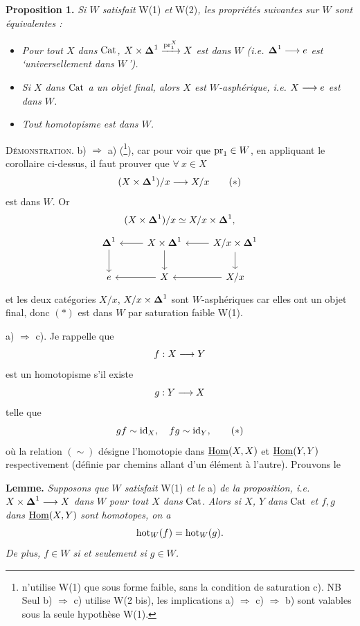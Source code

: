 \textbf{Proposition 1.} \textit{Si $W$ satisfait} W(1) \textit{et} W(2)\textit{, les propriétés suivantes sur $W$ sont équivalentes :}

\begin{itemize}[leftmargin=*]
\item[\textit{a)}] \textit{Pour tout $X$ dans $\mathrm{Cat}$, $X \times \boldsymbol{\Delta}^1 \xrightarrow{\mathrm{pr}_1^X} X$ est dans $W$ (i.e. $\boldsymbol{\Delta}^1 \longrightarrow e$ est `universellement dans $W$\,').}

\item[\textit{b)}] \textit{Si $X$ dans $\mathrm{Cat}$ a un objet final, alors $X$ est $W$-asphérique, i.e. $X \longrightarrow e$ est dans $W$.}

\item[\textit{c)}] \textit{Tout homotopisme est dans $W$.}
\end{itemize}

\clearpage


\textsc{Démonstration.} b) $\Longrightarrow$ a) (\footnote{n'utilise W(1) que sous forme faible, sans la condition de saturation c). NB Seul b) $\Longrightarrow$ c) utilise W(2 bis), les implications a) $\Longrightarrow$ c) $\Longrightarrow$ b) sont valables sous la seule hypothèse W(1).}), car pour voir que $\mathrm{pr}_1 \in W$, en appliquant le corollaire ci-dessus, il faut prouver que $\forall\ x \in X$
\[ (X \times \boldsymbol{\Delta}^1)/x \longrightarrow X/x \tag*{$(*)$} \]
est dans $W$. Or
\[ (X \times \boldsymbol{\Delta}^1)/x \simeq X/x \times \boldsymbol{\Delta}^1, \]
\[
\begin{tikzcd}
\Dl^1 \arrow[d] & X \times \Dl^1 \arrow[l] \arrow[d] & X/x \times \Dl^1 \arrow[l] \arrow[d] \\
e & X \arrow[l] & X/x \arrow[l]
\end{tikzcd}
\]
 et les deux catégories $X/x$, $X/x \times \boldsymbol{\Delta}^1$ sont $W$-asphériques car elles ont un objet final, donc $(*)$ est dans $W$ par saturation faible W(1).

a) $\Longrightarrow$ c). Je rappelle que
\[ f : X \longrightarrow Y \]
est un homotopisme s'il existe
\[ g : Y \longrightarrow X \]
telle que
\[ gf \sim \mathrm{id}_X, \quad fg \sim \mathrm{id}_Y, \tag*{$(*)$} \]
où la relation $(\sim)$ désigne l'homotopie dans $\underline{\mathrm{Hom}}(X,X)$ et $\underline{\mathrm{Hom}}(Y,Y)$ respectivement (définie par chemins allant d'un élément à l'autre). Prouvons le

\textbf{Lemme.} \textit{Supposons que $W$ satisfait} W(1) \textit{et le} a) \textit{de la proposition, i.e. $X \times \boldsymbol{\Delta}^1 \longrightarrow X$ dans $W$ pour tout $X$ dans} $\mathrm{Cat}$. \textit{Alors si $X$, $Y$} \textit{dans} $\mathrm{Cat}$ \textit{et $f, g$ dans} $\underline{\mathrm{Hom}}(X,Y)$ \textit{sont homotopes, on a}
\[ \mathrm{hot}_W(f) = \mathrm{hot}_W(g). \]
\textit{De plus, $f \in W$ si et seulement si $g \in W$.}

